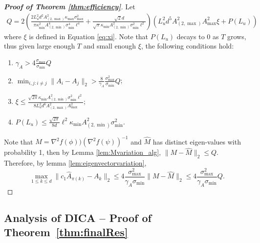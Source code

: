 \begin{proof}[{\bf Proof of Theorem  \ref{thm:efficiency}}]
Let 
 \begin{align*}
Q = 2\left( \frac{2L_u^2d^2A_{(2,\max)}^2\kappa_{\max}\sigma_{\max}^2}{\pi\kappa^2_{\min}A^4_{(2,\min)}\sigma_{\min}^4\ell^4} + 
\frac{\sqrt{2}d}{\sqrt{\pi}\kappa_{\min}A^2_{(2,\min)}\sigma_{\min}^2\ell^2}
\right)\left(L_u^2d^5 A_{(2,\max)}^2A_{\max}^2\xi + P(L_u)\right)
 \end{align*}
 where $\xi$ is defined in Equation \eqref{eq:xi}.
 Note that $P(L_u)$ decays to 0 as $T$ grows, thus given large enough $T$ and small enough $\xi$, the following conditions hold:
 \begin{enumerate}
 \vspace{-3mm}
 \item $\gamma_A > 4\frac{\sigma_{\max}}{\sigma_{\min}} Q$
 \item $\min_{i,j:i\neq j} \|A_i - A_j\|_2 > \frac{8}{\gamma_A}\frac{\sigma_{\max}^2}{\sigma_{\min}} Q$;
 \item $\xi \le \frac{\sqrt{2\pi}\kappa_{\min}A^2_{(2,\min)}\sigma_{\min}^2\ell^2}{8L_u^2d^6 A_{(2,\max)}^2A_{\max}^2}$;
 \item  $P(L_u) \le \frac{\sqrt{2\pi}}{8d}\ell^2\kappa_{\min}A^2_{(2,\min)}\sigma_{\min}^2$. 
  \end{enumerate}

Note that $M = \nabla^2f(\phi))(\nabla^2f(\psi))^{-1}$ and $\hat{M}$ has distinct eigen-values with probability 1,  then by Lemma \ref{lem:Mvariation_alg}, $\|M-\hat{M}\|_2 \le Q$.
Therefore, by lemma \ref{lem:eigenvectorvariation}, 
  \[
  \max_{1\le k\le d}\| c_1\hat{A}_{\pi(k)} - A_k\|_2 \le 4 \frac{\sigma_{\max}^2}{\gamma_A \sigma_{\min}}\|M - \hat{M} \|_2 \le 4 \frac{\sigma_{\max}^2}{\gamma_A \sigma_{\min}} Q. 
  \]
 
\end{proof}

\subsection{Analysis of DICA -- Proof of Theorem~\ref{thm:finalRes}}
\label{subsec:ProofModEff}

